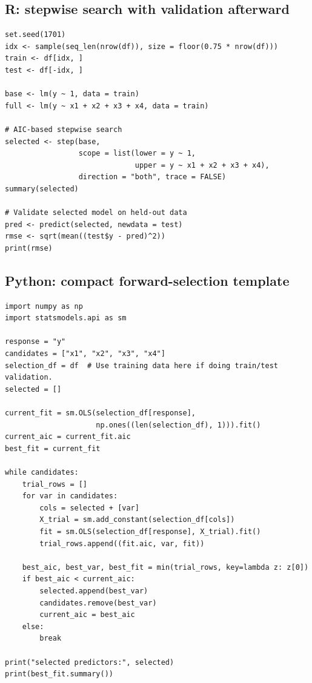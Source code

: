 \subsection*{R: stepwise search with validation afterward}

\begin{verbatim}
set.seed(1701)
idx <- sample(seq_len(nrow(df)), size = floor(0.75 * nrow(df)))
train <- df[idx, ]
test <- df[-idx, ]

base <- lm(y ~ 1, data = train)
full <- lm(y ~ x1 + x2 + x3 + x4, data = train)

# AIC-based stepwise search
selected <- step(base,
                 scope = list(lower = y ~ 1,
                              upper = y ~ x1 + x2 + x3 + x4),
                 direction = "both", trace = FALSE)
summary(selected)

# Validate selected model on held-out data
pred <- predict(selected, newdata = test)
rmse <- sqrt(mean((test$y - pred)^2))
print(rmse)
\end{verbatim}

\subsection*{Python: compact forward-selection template}

\begin{verbatim}
import numpy as np
import statsmodels.api as sm

response = "y"
candidates = ["x1", "x2", "x3", "x4"]
selection_df = df  # Use training data here if doing train/test validation.
selected = []

current_fit = sm.OLS(selection_df[response],
                     np.ones((len(selection_df), 1))).fit()
current_aic = current_fit.aic
best_fit = current_fit

while candidates:
    trial_rows = []
    for var in candidates:
        cols = selected + [var]
        X_trial = sm.add_constant(selection_df[cols])
        fit = sm.OLS(selection_df[response], X_trial).fit()
        trial_rows.append((fit.aic, var, fit))

    best_aic, best_var, best_fit = min(trial_rows, key=lambda z: z[0])
    if best_aic < current_aic:
        selected.append(best_var)
        candidates.remove(best_var)
        current_aic = best_aic
    else:
        break

print("selected predictors:", selected)
print(best_fit.summary())
\end{verbatim}

